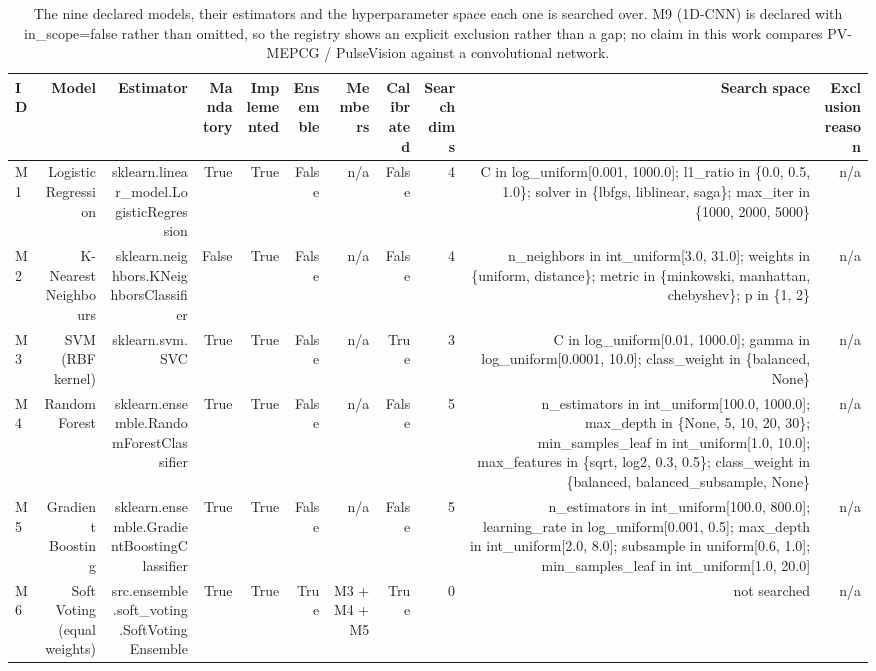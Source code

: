 \begin{table}[htbp]
  \centering
  \caption{The nine declared models, their estimators and the hyperparameter space each one is searched over. M9 (1D-CNN) is declared with in\_scope=false rather than omitted, so the registry shows an explicit exclusion rather than a gap; no claim in this work compares PV-MEPCG / PulseVision against a convolutional network.}
  \label{tab:t06}
  \begin{tabular}{lrrrrrrrrrr}
    \toprule
    ID & Model & Estimator & Mandatory & Implemented & Ensemble & Members & Calibrated & Search dims & Search space & Exclusion reason \\
    \midrule
    M1 & Logistic Regression & sklearn.linear\_model.LogisticRegression & True & True & False & n/a & False & 4 & C in log\_uniform[0.001, 1000.0]; l1\_ratio in \{0.0, 0.5, 1.0\}; solver in \{lbfgs, liblinear, saga\}; max\_iter in \{1000, 2000, 5000\} & n/a \\
    M2 & K-Nearest Neighbours & sklearn.neighbors.KNeighborsClassifier & False & True & False & n/a & False & 4 & n\_neighbors in int\_uniform[3.0, 31.0]; weights in \{uniform, distance\}; metric in \{minkowski, manhattan, chebyshev\}; p in \{1, 2\} & n/a \\
    M3 & SVM (RBF kernel) & sklearn.svm.SVC & True & True & False & n/a & True & 3 & C in log\_uniform[0.01, 1000.0]; gamma in log\_uniform[0.0001, 10.0]; class\_weight in \{balanced, None\} & n/a \\
    M4 & Random Forest & sklearn.ensemble.RandomForestClassifier & True & True & False & n/a & False & 5 & n\_estimators in int\_uniform[100.0, 1000.0]; max\_depth in \{None, 5, 10, 20, 30\}; min\_samples\_leaf in int\_uniform[1.0, 10.0]; max\_features in \{sqrt, log2, 0.3, 0.5\}; class\_weight in \{balanced, balanced\_subsample, None\} & n/a \\
    M5 & Gradient Boosting & sklearn.ensemble.GradientBoostingClassifier & True & True & False & n/a & False & 5 & n\_estimators in int\_uniform[100.0, 800.0]; learning\_rate in log\_uniform[0.001, 0.5]; max\_depth in int\_uniform[2.0, 8.0]; subsample in uniform[0.6, 1.0]; min\_samples\_leaf in int\_uniform[1.0, 20.0] & n/a \\
    M6 & Soft Voting (equal weights) & src.ensemble.soft\_voting.SoftVotingEnsemble & True & True & True & M3 + M4 + M5 & True & 0 & not searched & n/a \\

\end{tabular}
\end{table}
